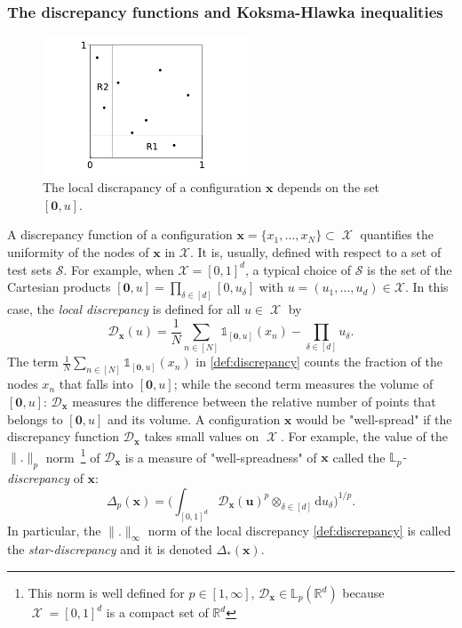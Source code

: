 \documentclass[twoside,11pt]{book}
\numberwithin{theorem}{chapter}
\numberwithin{definition}{chapter}
\numberwithin{proposition}{chapter}
\numberwithin{corollary}{chapter}
\numberwithin{example}{chapter}
\numberwithin{lemma}{chapter}
\numberwithin{assumption}{chapter}
\DeclareMathOperator{\X}{\mathcal{X}}
\begin{document}
 
\subsubsection{The discrepancy functions and Koksma-Hlawka inequalities}

\begin{figure}
\centering
\includegraphics[width= 0.55\textwidth]{img/discrepancy/local_discrepancy.pdf}
\caption{The local discrapancy of a configuration $\bm{x}$ depends on the set $[\bm{0},u]$. \label{fig:local_discrepancy}}
\end{figure}

 A discrepancy function of a configuration $\bm{x} = \{x_{1}, \dots, x_{N} \} \subset \X$ quantifies the uniformity of the nodes of $\bm{x}$ in $\mathcal{X}$. It is, usually, defined with respect to a set of test sets $\mathcal{S}$. For example, when $\mathcal{X} = [0,1]^{d}$, a typical choice of $\mathcal{S}$ is the set of the Cartesian products $[\bm{0},u] = \prod_{\delta \in [d]}[0,u_{\delta}]$ with $u = (u_{1}, \dots, u_{d}) \in \mathcal{X}$. In this case, the \emph{local discrepancy} is defined for all $u \in \X$ by 
\begin{equation}\label{def:discrepancy}
\mathcal{D}_{\bm{x}}(u) = \frac{1}{N}\sum\limits_{n \in [N]} \mathbb{1}_{[\bm{0},u]}(x_{n}) - \prod\limits_{\delta \in [d]}u_{\delta}.
\end{equation}  
The term $\frac{1}{N}\sum_{n \in [N]} \mathbb{1}_{[\bm{0},u]}(x_{n})$ in \eqref{def:discrepancy} counts the fraction of the nodes $x_{n}$ that falls into $[\bm{0},u]$; while the second term measures the volume of $[\bm{0},u]$: $\mathcal{D}_{\bm{x}}$ measures the difference between the relative number of points that belongs to $[\bm{0},u]$ and its volume. A configuration $\bm{x}$ would be "well-spread" if the discrepancy function $\mathcal{D}_{\bm{x}}$ takes small values on $\X$. For example, the value of the $\|.\|_{p}$ norm~\footnote{This norm is well defined for $p \in [1,\infty]$, $\mathcal{D}_{\bm{x}} \in \mathbb{L}_{p}(\mathbb{R}^{d})$ because $\X = [0,1]^{d}$ is a compact set of $\mathbb{R}^{d}$} of $\mathcal{D}_{\bm{x}}$ is a measure of "well-spreadness" of $\bm{x}$ called the \emph{$\mathbb{L}_{p}$-discrepancy} of $\bm{x}$:
\begin{equation}
\Delta_{p}(\bm{x}) = \bigg(\int_{[0,1]^{d}}\mathcal{D}_{\bm{x}}(\bm{u})^{p} \otimes_{\delta \in [d]} \mathrm{d}u_{\delta}\bigg)^{1/p}.
\end{equation}
In particular, the $\|.\|_{\infty}$ norm of the local discrepancy \eqref{def:discrepancy} is called the \emph{star-discrepancy} and it is denoted $\Delta_{*}(\bm{x})$.
\end{document}
